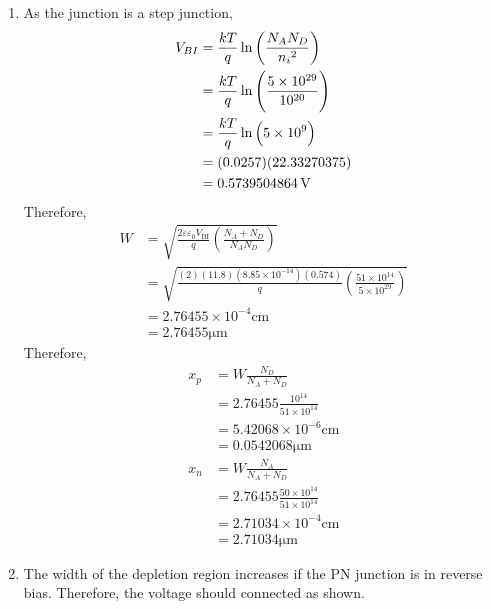 \documentclass[fleqn, a4paper, 10pt, oneside]{amsart}
\theoremstyle{definition}
\theoremstyle{theorem}
\begin{document}
\begin{solution}
	\begin{enumerate}[leftmargin=*]
		\item
			As the junction is a step junction,
			\begin{align*}
				V_{BI} &= \frac{k T}{q} \ln\left( \frac{N_A N_D}{{n_i}^2} \right)\\
				&= \frac{k T}{q} \ln\left( \frac{5 \times 10^{29}}{10^{20}} \right)\\
				&= \frac{k T}{q} \ln\left( 5 \times 10^9 \right)\\
				&= (0.0257) (22.33270375)\\
				&= 0.5739504864 \volt
			\end{align*}
			Therefore,
			\begin{align*}
				W &= \sqrt{\frac{2 \varepsilon \varepsilon_0 V_{\text{BI}}}{q} \left( \frac{N_A + N_D}{N_A N_D} \right)}\\
				&= \sqrt{\frac{(2) (11.8) \left( 8.85 \times 10^{-14} \right) (0.574)}{q} \left( \frac{51 \times 10^{14}}{5 \times 10^{29}} \right)}\\
				&= 2.76455 \times 10^{-4} \si{\centi\metre}\\
				&= 2.76455 \si{\micro\metre}
			\end{align*}
			Therefore,
			\begin{align*}
				x_p &= W \frac{N_D}{N_A + N_D}\\
				&= 2.76455 \frac{10^{14}}{51 \times 10^{14}}\\
				&= 5.42068 \times 10^{-6} \si{\centi\metre}\\
				&= 0.0542068 \si{\micro\metre}\\
				x_n &= W \frac{N_A}{N_A + N_D}\\
				&= 2.76455 \frac{50 \times 10^{14}}{51 \times 10^{14}}\\
				&= 2.71034 \times 10^{-4} \si{\centi\metre}\\
				&= 2.71034 \si{\micro\metre}
			\end{align*}
		\item
			The width of the depletion region increases if the PN junction is in reverse bias.
			Therefore, the voltage should connected as shown.
			\begin{figure}[H]
				\centering
\end{figure}
\end{enumerate}
\end{solution}
\end{document}
